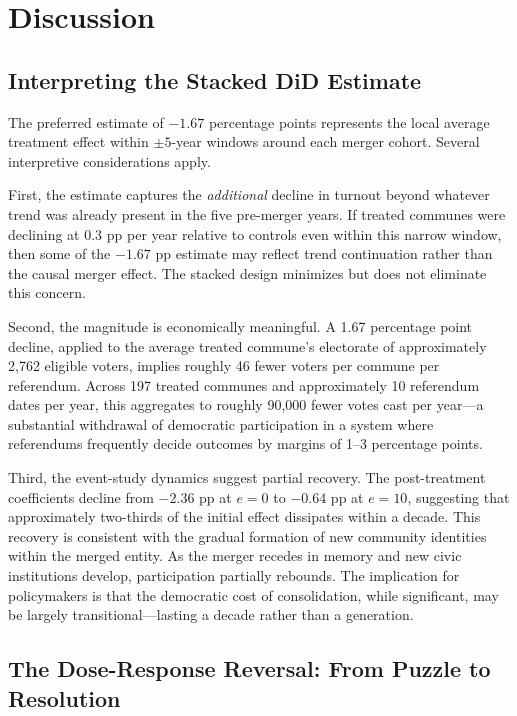 \documentclass[12pt]{article}
\begin{document}
\section{Discussion}

\subsection{Interpreting the Stacked DiD Estimate}

The preferred estimate of $-1.67$ percentage points represents the local average treatment effect within $\pm 5$-year windows around each merger cohort. Several interpretive considerations apply.

First, the estimate captures the \textit{additional} decline in turnout beyond whatever trend was already present in the five pre-merger years. If treated communes were declining at 0.3 pp per year relative to controls even within this narrow window, then some of the $-1.67$ pp estimate may reflect trend continuation rather than the causal merger effect. The stacked design minimizes but does not eliminate this concern.

Second, the magnitude is economically meaningful. A 1.67 percentage point decline, applied to the average treated commune's electorate of approximately 2,762 eligible voters, implies roughly 46 fewer voters per commune per referendum. Across 197 treated communes and approximately 10 referendum dates per year, this aggregates to roughly 90,000 fewer votes cast per year---a substantial withdrawal of democratic participation in a system where referendums frequently decide outcomes by margins of 1--3 percentage points.

Third, the event-study dynamics suggest partial recovery. The post-treatment coefficients decline from $-2.36$ pp at $e = 0$ to $-0.64$ pp at $e = 10$, suggesting that approximately two-thirds of the initial effect dissipates within a decade. This recovery is consistent with the gradual formation of new community identities within the merged entity. As the merger recedes in memory and new civic institutions develop, participation partially rebounds. The implication for policymakers is that the democratic cost of consolidation, while significant, may be largely transitional---lasting a decade rather than a generation.

\subsection{The Dose-Response Reversal: From Puzzle to Resolution}
\end{document}

